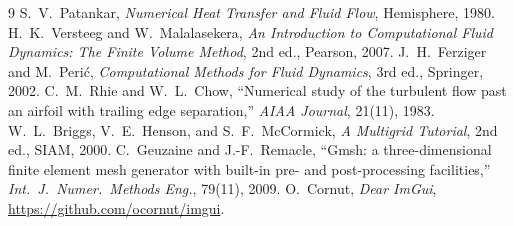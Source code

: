 \documentclass[11pt]{article}
\begin{document}
\begin{thebibliography}{9}
 S.~V.~Patankar, \emph{Numerical Heat Transfer and Fluid Flow}, Hemisphere, 1980.
 H.~K.~Versteeg and W.~Malalasekera, \emph{An Introduction to Computational Fluid Dynamics: The Finite Volume Method}, 2nd ed., Pearson, 2007.
 J.~H.~Ferziger and M.~Peri\'c, \emph{Computational Methods for Fluid Dynamics}, 3rd ed., Springer, 2002.
 C.~M.~Rhie and W.~L.~Chow, ``Numerical study of the turbulent flow past an airfoil with trailing edge separation,'' \emph{AIAA Journal}, 21(11), 1983.
 W.~L.~Briggs, V.~E.~Henson, and S.~F.~McCormick, \emph{A Multigrid Tutorial}, 2nd ed., SIAM, 2000.
 C.~Geuzaine and J.-F.~Remacle, ``Gmsh: a three-dimensional finite element mesh generator with built-in pre- and post-processing facilities,'' \emph{Int.\ J.\ Numer.\ Methods Eng.}, 79(11), 2009.
 O.~Cornut, \emph{Dear ImGui}, \url{https://github.com/ocornut/imgui}.
\end{thebibliography}
\end{document}
